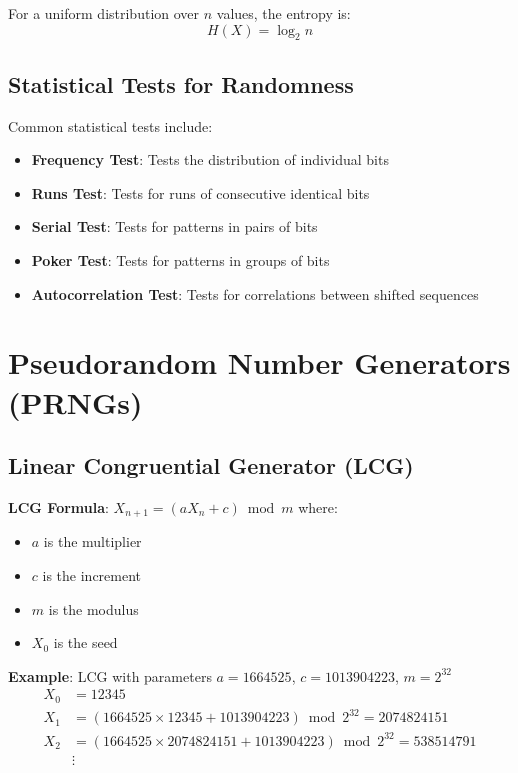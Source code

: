 \documentclass[11pt,a4paper]{article}
\begin{document}
For a uniform distribution over $n$ values, the entropy is:
\[H(X) = \log_2 n\]

\subsection{Statistical Tests for Randomness}

Common statistical tests include:
\begin{itemize}
    \item \textbf{Frequency Test}: Tests the distribution of individual bits
    \item \textbf{Runs Test}: Tests for runs of consecutive identical bits
    \item \textbf{Serial Test}: Tests for patterns in pairs of bits
    \item \textbf{Poker Test}: Tests for patterns in groups of bits
    \item \textbf{Autocorrelation Test}: Tests for correlations between shifted sequences
\end{itemize}

\section{Pseudorandom Number Generators (PRNGs)}

\subsection{Linear Congruential Generator (LCG)}

\begin{mathbox}
\textbf{LCG Formula}: $X_{n+1} = (aX_n + c) \bmod m$
where:
\begin{itemize}
    \item $a$ is the multiplier
    \item $c$ is the increment
    \item $m$ is the modulus
    \item $X_0$ is the seed
\end{itemize}
\end{mathbox}

\begin{examplebox}
\textbf{Example}: LCG with parameters $a = 1664525$, $c = 1013904223$, $m = 2^{32}$
\begin{align*}
X_0 &= 12345 \\
X_1 &= (1664525 \times 12345 + 1013904223) \bmod 2^{32} = 2074824151 \\
X_2 &= (1664525 \times 2074824151 + 1013904223) \bmod 2^{32} = 538514791 \\
&\vdots
\end{align*}
\end{examplebox}
\end{document}
